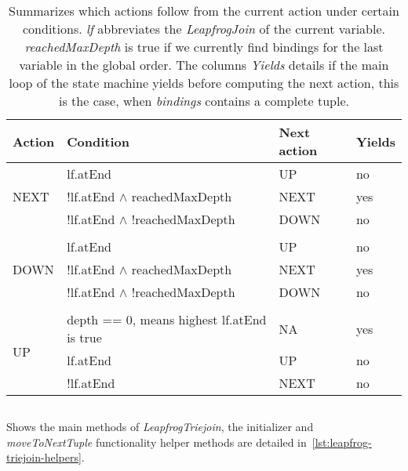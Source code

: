 \begin{table}[]
    \centering
    \begin{tabular}{@{}llll@{}}
        \toprule
        Action                & Condition                                  & Next action & Yields \\ \midrule
        \multirow{3}{*}{NEXT} & lf.atEnd                                   & UP          & no     \\
        & !lf.atEnd $\wedge$ reachedMaxDepth             & NEXT        & yes    \\
        & !lf.atEnd $\wedge$ !reachedMaxDepth            & DOWN        & no     \\
        & & &\\
        \multirow{3}{*}{DOWN} & lf.atEnd                                   & UP          & no     \\
        & !lf.atEnd $\wedge$ reachedMaxDepth             & NEXT        & yes    \\
        & !lf.atEnd $\wedge$ !reachedMaxDepth            & DOWN        & no     \\
        & & &\\
        \multirow{3}{*}{UP}     & depth == 0, means highest lf.atEnd is true & NA          & yes    \\
        & lf.atEnd                                   & UP          & no     \\
        & !lf.atEnd                                  & NEXT        & no     \\ \bottomrule
    \end{tabular}
    \caption{Summarizes which actions follow from the current action under certain conditions. \textit{lf} abbreviates the
    \textit{LeapfrogJoin} of the current variable.
    \textit{reachedMaxDepth} is true if we currently find bindings for the
    last variable in the global order.
    The columns \textit{Yields} details if the main loop of the state machine yields before computing the next action,
    this is the case, when \textit{bindings} contains a complete tuple.
    }
    \label{table:lftj-state-machine}
\end{table}

\begin{listing}[H]
    \inputminted[mathescape, linenos=true]{scala}{code/LeapfrogTriejoinIdiomatic.scala}
    \caption{Shows the main methods of \textit{LeapfrogTriejoin}, the initializer and \textit{moveToNextTuple} functionality
    helper methods are detailed in~\cref{lst:leapfrog-triejoin-helpers}.}
    \label{lst:leapfrog-triejoin}
\end{listing}

